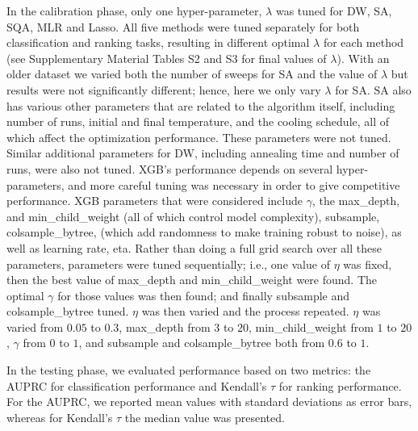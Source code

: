 \documentclass[aps,pra,groupedaddress,nofootinbib,notitlepage,showpacs,floatfix,superscriptaddress]{revtex4-1}
\begin{document}
In the calibration phase, only one hyper-parameter, $\lambda$ was tuned for DW, SA, SQA, MLR and Lasso. All five methods were tuned separately for both classification and ranking tasks, resulting in different optimal $\lambda$ for each method (see Supplementary Material Tables S2 and S3 for final values of $\lambda$). With an older dataset we varied both the number of sweeps for SA and the value of $\lambda$ but results were not significantly different; hence, here we only vary $\lambda$ for SA. SA also has various other parameters that are related to the algorithm itself, including number of runs, initial and final temperature, and the cooling schedule, all of which affect the optimization performance. These parameters were not tuned. Similar additional parameters for DW, including annealing time and number of runs, were also not tuned. XGB's performance depends on several hyper-parameters, and more careful tuning was necessary in order to give competitive performance. XGB parameters \cite{Chen:16} that were considered include $\gamma$, the max\_depth, and min\_child\_weight (all of which control model complexity), subsample, colsample\_bytree, (which add randomness to make training robust to noise), as well as learning rate, eta. Rather than doing a full grid search over all these parameters, parameters were tuned sequentially; i.e., one value of $\eta$ was fixed, then the best value of max\_depth and min\_child\_weight were found. The optimal $\gamma$ for those values was then found; and finally subsample and colsample\_bytree tuned. $\eta$ was then varied and the process repeated. $\eta$ was varied from $0.05$ to $0.3$, max\_depth from $3$ to $20$, min\_child\_weight from $1$ to $20$, $\gamma$ from $0$ to $1$, and subsample and colsample\_bytree both from $0.6$ to $1$.

In the testing phase, we evaluated performance based on two metrics:  the AUPRC for classification performance and Kendall's $\tau$ for ranking performance. For the AUPRC, we reported mean values with standard deviations as error bars, whereas for Kendall's $\tau$ the median value was presented. 
\end{document}
